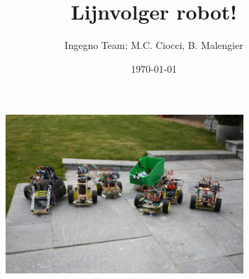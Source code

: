 \documentclass[8pt,a5paper]{article}
\newcommand{\nedt}[1]{{#1}}
\newcommand{\engt}[1]{ }
\begin{document}
 \title{Lijnvolger robot!}
 \author{Ingegno Team: M.C. Ciocci, B. Malengier}
 \date{\today}
 \maketitle

\begin{figure}[h]
  \centering
  \includegraphics[width=9cm]{pic/robotteam.jpg}
\label{f:ingrobots}       %
\end{figure}

\begin{Parallel}{7.5cm}{7.5cm}



\end{Parallel}
\end{document}
